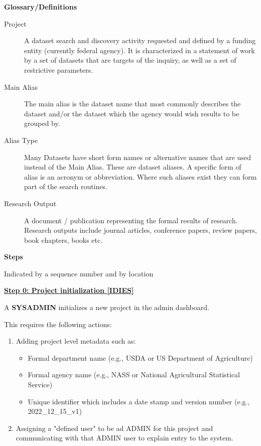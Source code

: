\documentclass[titlepage, 11pt]{article}
\begin{document}
{\textbf{\textcolor{TealBlue}{Glossary/Definitions}}
\begin{description}
    \item[Project] A dataset search and discovery activity requested and defined by a funding entity (currently federal agency). It is characterized in a statement of work by a set of datasets that are targets of the inquiry, as well as a set of restrictive parameters. 
    \item[Main Alias] The main alias is the dataset name that most commonly describes the dataset and/or the dataset which the agency would wish results to be grouped by. 
    \item[Alias Type] Many Datasets have short form names or alternative names that are used instead of the Main Alias. These are dataset aliases. A specific form of alias is an acronym or abbreviation. Where such aliases exist they can form part of the search routines. 
    \item[Research Output] A document / publication representing the formal results of research. Research outputs include journal articles, conference papers, review papers, book chapters, books etc.
\end{description}

\bigskip

\textbf{\textcolor{TealBlue}{Steps}}

Indicated by a sequence number and by location

\bigskip
\bigskip

\underline{\textbf{Step 0: Project initialization [IDIES]}}

A \textbf{SYSADMIN} initializes a new project in the admin dashboard.

This requires the following actions:
\begin{enumerate}
    \item Adding project level metadata such as: \begin{itemize}
        \item Formal department name (e.g., USDA or US Department of Agriculture)
        \item Formal agency name (e.g., NASS or National Agricultural Statistical Service)
        \item Unique identifier which includes a date stamp and version number (e.g., 2022\_12\_15\_v1)
    \end{itemize}
    \item Assigning a "defined user" to be ad ADMIN for this project and communicating with that ADMIN user to explain entry to the system.
\end{enumerate}

}
\end{document}
